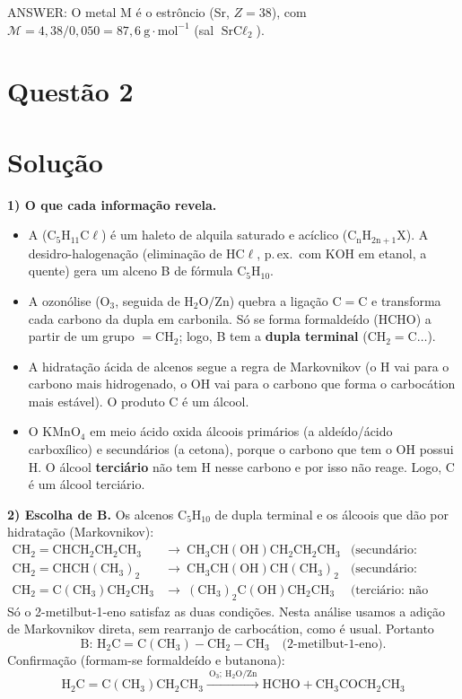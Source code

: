 \documentclass{article}%
\begin{document}
\medskip
\noindent ANSWER: O metal M é o estrôncio (Sr, $Z = 38$), com $\mathcal{M} = 4{,}38/0{,}050 = 87{,}6\ \text{g}\cdot\text{mol}^{-1}$ (sal $\text{SrC}\ell_2$).%
\newpage%
\section*{Questão 2}

\section*{Solução}

\textbf{1) O que cada informação revela.}
\begin{itemize}
\item A ($\mathrm{C_5H_{11}C\ell}$) é um haleto de alquila saturado e acíclico ($\mathrm{C_nH_{2n+1}X}$). A desidro-halogenação (eliminação de HC$\ell$, p.\,ex.\ com KOH em etanol, a quente) gera um alceno B de fórmula $\mathrm{C_5H_{10}}$.
\item A ozonólise ($\mathrm{O_3}$, seguida de $\mathrm{H_2O/Zn}$) quebra a ligação $\mathrm{C=C}$ e transforma cada carbono da dupla em carbonila. Só se forma formaldeído ($\mathrm{HCHO}$) a partir de um grupo $\mathrm{=CH_2}$; logo, B tem a \textbf{dupla terminal} ($\mathrm{CH_2=C\ldots}$).
\item A hidratação ácida de alcenos segue a regra de Markovnikov (o H vai para o carbono mais hidrogenado, o OH vai para o carbono que forma o carbocátion mais estável). O produto C é um álcool.
\item O $\mathrm{KMnO_4}$ em meio ácido oxida álcoois primários (a aldeído/ácido carboxílico) e secundários (a cetona), porque o carbono que tem o OH possui H. O álcool \textbf{terciário} não tem H nesse carbono e por isso não reage. Logo, C é um álcool terciário.
\end{itemize}

\textbf{2) Escolha de B.} Os alcenos $\mathrm{C_5H_{10}}$ de dupla terminal e os álcoois que dão por hidratação (Markovnikov):
\[
\begin{array}{lll}
\mathrm{CH_2=CHCH_2CH_2CH_3} & \to\ \mathrm{CH_3CH(OH)CH_2CH_2CH_3} & \text{(secundário: oxida)}\\[2pt]
\mathrm{CH_2=CHCH(CH_3)_2} & \to\ \mathrm{CH_3CH(OH)CH(CH_3)_2} & \text{(secundário: oxida)}\\[2pt]
\mathrm{CH_2=C(CH_3)CH_2CH_3} & \to\ \mathrm{(CH_3)_2C(OH)CH_2CH_3} & \text{(terciário: não oxida)}
\end{array}
\]
Só o 2-metilbut-1-eno satisfaz as duas condições. Nesta análise usamos a adição de Markovnikov direta, sem rearranjo de carbocátion, como é usual. Portanto
\[
\text{B: } \mathrm{H_2C=C(CH_3)-CH_2-CH_3}\quad\text{(2-metilbut-1-eno)}.
\]
Confirmação (formam-se formaldeído e butanona):
\[
\mathrm{H_2C=C(CH_3)CH_2CH_3 \xrightarrow{\ O_3;\ H_2O/Zn\ } HCHO + CH_3COCH_2CH_3}
\]
\end{document}
